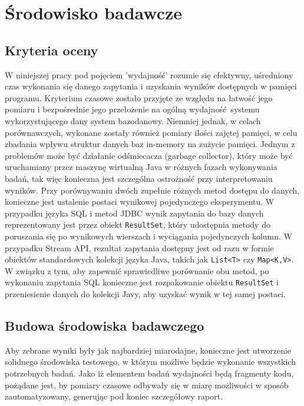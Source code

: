 \documentclass[12pt]{extarticle}
\begin{document}
\section{Środowisko badawcze}

\subsection{Kryteria oceny}

    W niniejszej pracy pod pojęciem 'wydajność' rozumie się efektywny, uśredniony czas wykonania się danego zapytania i uzyskania wyników dostępnych w pamięci programu. Kryterium czasowe zostało przyjęte ze względu na łatwość jego pomiaru i bezpośrednie jego przełożenie na ogólną wydajność systemu wykorzystującego dany system bazodanowy. Niemniej jednak, w celach porównawczych, wykonane zostały również pomiary ilości zajętej pamięci, w celu zbadania wpływu struktur danych baz in-memory na zużycie pamięci. Jednym z problemów może być działanie odśmiecacza (garbage collector), który może być uruchamiany przez maszynę wirtualną Java w różnych fazach wykonywania badań, tak więc konieczna jest szczególna ostrożność przy interpretowaniu wyników.
    Przy porównywaniu dwóch zupełnie różnych metod dostępu do danych, konieczne jest ustalenie postaci wynikowej pojedynczego eksperymentu. W przypadku języka SQL i metod JDBC wynik zapytania do bazy danych reprezentowany jest przez obiekt \texttt{ResultSet}, który udostępnia metody do poruszania się po wynikowych wierszach i wyciągania pojedynczych kolumn. W przypadku Stream API, rezultat zapytania dostępny jest od razu w formie obiektów standardowych kolekcji języka Java, takich jak \texttt{List<T>} czy \texttt{Map<K,V>}. W związku z tym, aby zapewnić sprawiedliwe porównanie obu metod, po wykonaniu zapytania SQL konieczne jest rozpakowanie obiektu \texttt{ResultSet} i przeniesienie danych do kolekcji Javy, aby uzyskać wynik w tej samej postaci.

\subsection{Budowa środowiska badawczego}

    Aby zebrane wyniki były jak najbardziej miarodajne, konieczne jest utworzenie solidnego środowiska testowego, w którym możliwe będzie wykonanie wszystkich potrzebnych badań. Jako iż elementem badań wydajności będą fragmenty kodu, pożądane jest, by pomiary czasowe odbywały się w miarę możliwości w sposób zautomatyzowany, generując pod koniec szczegółowy raport.
\end{document}
